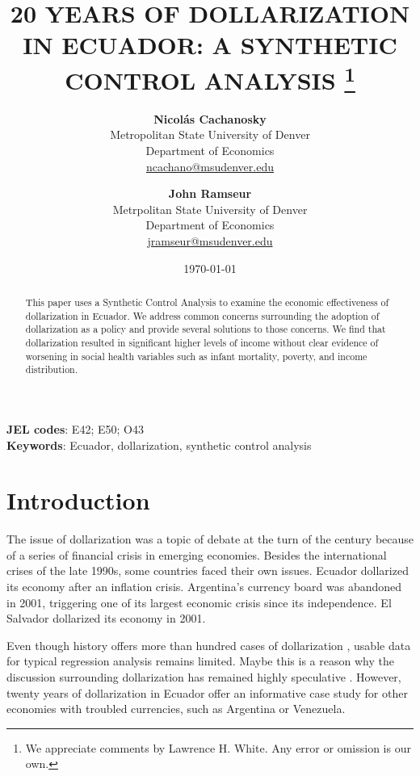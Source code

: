 \documentclass[12pt]{article}
\title{20 YEARS OF DOLLARIZATION IN ECUADOR: A SYNTHETIC CONTROL ANALYSIS
       \thanks{We appreciate comments by Lawrence H. White. Any error or omission is our own.} \\
       \bigskip}
\author{
        \textbf{Nicolás Cachanosky} \\
        Metropolitan State University of Denver \\
        Department of Economics \\
        \href{mailto:ncachano@msudenver.edu}{ncachano@msudenver.edu} \\
        \and
        \textbf{John Ramseur} \\
        Metrpolitan State University of Denver \\
        Department of Economics \\
        \href{mailto:jramseur@msudenver.edu}{jramseur@msudenver.edu} \\
        \bigskip}
\date{\today}
\begin{document}

\maketitle

\begin{abstract}
\noindent
This paper uses a Synthetic Control Analysis to examine the economic effectiveness of dollarization in Ecuador. We address common concerns surrounding the adoption of dollarization as a policy and provide several solutions to those concerns. We find that dollarization resulted in significant higher levels of income without clear evidence of worsening in social health variables such as infant mortality, poverty, and income distribution.
\end{abstract}

\bigskip \bigskip
\footnotesize \noindent \textbf{JEL codes}: E42; E50; O43 \\
\footnotesize \noindent \textbf{Keywords}: Ecuador, dollarization, synthetic control analysis

\newpage
\doublespacing


\section{Introduction} 
    \label{sec:intro}

The issue of dollarization was a topic of debate at the turn of the century because of a series of financial crisis in emerging economies. Besides the international crises of the late 1990s, some countries faced their own issues. Ecuador dollarized its economy after an inflation crisis. Argentina's currency board was abandoned in 2001, triggering one of its largest economic crisis since its independence. El Salvador dollarized its economy in 2001.

Even though history offers more than hundred cases of dollarization \parencite{Schuler2005}, usable data for typical regression analysis remains limited. Maybe this is a reason why the discussion surrounding dollarization has remained highly speculative \parencite[for a sample see][]{Levy-Yeyati2002,Salvatore2003}. However, twenty years of dollarization in Ecuador offer an informative case study for other economies with troubled currencies, such as Argentina or Venezuela. 
\end{document}
